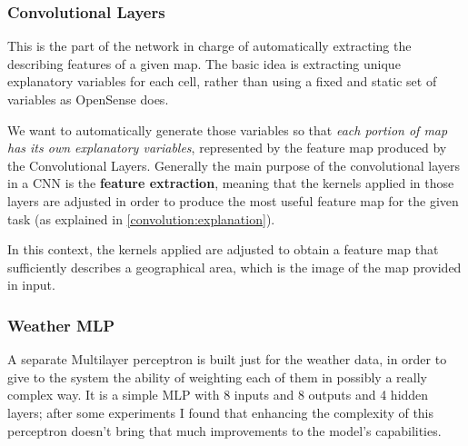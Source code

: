 \documentclass[11pt,a4paper,titlepage]{book}
\begin{document}
\subsubsection{Convolutional Layers}
This is the part of the network in charge of automatically extracting the describing features of a given map. The basic idea is extracting unique explanatory variables for each cell, rather than using a fixed and static set of variables as OpenSense does.

We want to automatically generate those variables so that \textit{each portion of map has its own explanatory variables}, represented by the feature map produced by the Convolutional Layers.
\newline
\newline
Generally the main purpose of the convolutional layers in a CNN is the \textbf{feature extraction}, meaning that the kernels applied in those layers are adjusted in order to produce the most useful feature map for the given task (as explained in \ref{convolution:explanation}). 

In this context, the kernels applied are adjusted to obtain a feature map that sufficiently describes a geographical area, which is the image of the map provided in input.
\subsubsection{Weather MLP}
A separate Multilayer perceptron is built just for the weather data, in order to give to the system the ability of weighting each of them in possibly a really complex way.
\newline
\newline
It is a simple MLP with 8 inputs and 8 outputs and 4 hidden layers; after some experiments I found that enhancing the complexity of this perceptron doesn't bring that much improvements to the model's capabilities. 
\end{document}

